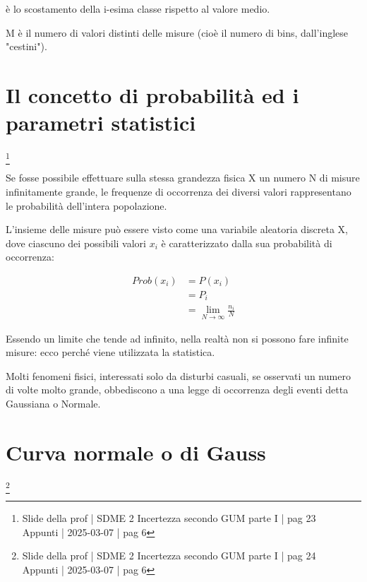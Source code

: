 è lo scostamento della i-esima classe rispetto al valore medio. \newline 

M è il numero di valori distinti delle misure (cioè il numero di bins, dall'inglese "cestini"). \newline 

\newpage 

\section{Il concetto di probabilità ed i parametri statistici}
\footnote{Slide della prof | SDME 2 Incertezza secondo GUM parte I | pag 23 \\  
Appunti | 2025-03-07 | pag 6}

Se fosse possibile effettuare sulla stessa grandezza fisica X 
un numero N di misure infinitamente grande, 
le frequenze di occorrenza dei diversi valori rappresentano le probabilità dell'intera popolazione. \newline 

L'insieme delle misure può essere visto come una variabile aleatoria discreta X, 
dove ciascuno dei possibili valori $x_i$ è caratterizzato dalla sua probabilità di occorrenza: 

{
    \Large 
    \begin{equation}
        \begin{split}
            Prob(x_i)
            &= 
            P(x_i) 
            \\ 
            &=
            P_i 
            \\ 
            &= 
            \lim_{N \to \infty} 
            \frac{n_i}{N}
        \end{split}
    \end{equation}
}

Essendo un limite che tende ad infinito, nella realtà non si possono fare infinite misure: 
ecco perché viene utilizzata la statistica. \newline 

Molti fenomeni fisici, interessati solo da disturbi casuali, se osservati un numero di volte molto grande, 
obbediscono a una legge di occorrenza degli eventi detta Gaussiana o Normale. \newline 

\newpage 

\section{Curva normale o di Gauss}
\footnote{Slide della prof | SDME 2 Incertezza secondo GUM parte I | pag 24 \\  
Appunti | 2025-03-07 | pag 6}

